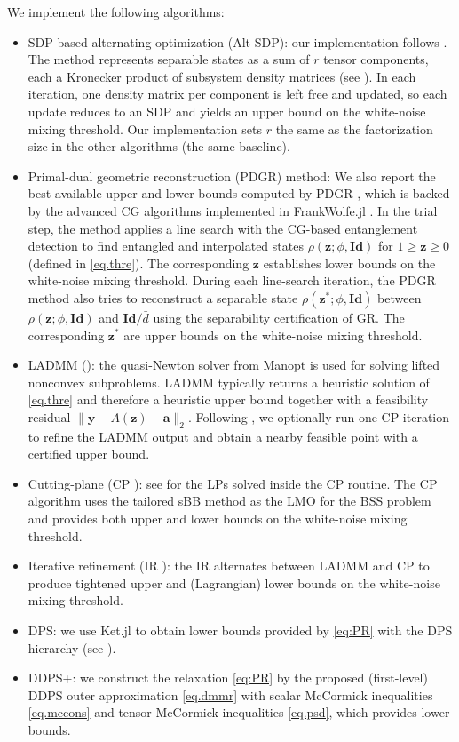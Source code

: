 \documentclass[smallextended]{svjour3}
\newcommand{\1}{\mathbf{1}}
\newcommand{\y}{\mathbf{y}}
\newcommand{\z}{\mathbf{z}}
\newcommand{\Id}{\mathbf{Id}}
\renewcommand{\a}{\mathbf{a}}
\begin{document}
We implement the following algorithms:

\begin{itemize}
    \item SDP-based alternating optimization (Alt-SDP): our implementation follows \cite{Ohst2024certifying}. The method represents separable states as a sum of $r$ tensor components, each a Kronecker product of subsystem density matrices (see ). In each iteration, one density matrix per component is left free and updated, so each update reduces to an SDP and yields an upper bound on the white-noise mixing threshold. Our implementation sets $r$ the same as the factorization size in the other algorithms (the same baseline).
    \item Primal-dual geometric reconstruction (PDGR) method: We also report the best available upper and lower bounds computed by PDGR \cite{liu2025unified}, which is backed by the advanced CG algorithms implemented in FrankWolfe.jl \cite{besanccon2022frankwolfe}. In the trial step, the method applies a line search with the CG-based entanglement detection to find entangled and interpolated states $\rho(\z; \phi,\Id)$ for $ 1 \ge \z \ge 0$ (defined in \eqref{eq.thre}). The corresponding  $\z$ establishes lower bounds on the white-noise mixing threshold. During each line-search iteration, the PDGR method also tries to reconstruct a separable state $\rho(\z^*; \phi,\Id)$ between $\rho(\z; \phi,\Id)$ and $\Id/\bar{d}$ using the separability certification of GR. The corresponding $\z^*$ are upper bounds on the white-noise mixing threshold.


    \item LADMM (): the quasi-Newton solver from Manopt is used for solving lifted nonconvex subproblems. LADMM typically returns a heuristic solution of \eqref{eq.thre} and therefore a heuristic upper bound together with a feasibility residual $\| \y - A(\z) - \a\|_2$. Following , we optionally run one CP iteration to refine the LADMM output and obtain a nearby feasible point with a certified upper bound.
    \item Cutting-plane (CP ): see  for the LPs solved inside the CP routine. The CP algorithm uses the tailored sBB method as the LMO for the BSS problem and provides both upper and lower bounds on the white-noise mixing threshold.
    \item Iterative refinement (IR ): the IR alternates between LADMM and CP to produce tightened upper and (Lagrangian) lower bounds on the white-noise mixing threshold.
    \item DPS: we use  Ket.jl to obtain lower bounds provided by \eqref{eq:PR} with the DPS hierarchy (see ).
    \item DDPS+: we construct the relaxation \eqref{eq:PR} by the proposed (first-level) DDPS outer approximation \eqref{eq.dmmr}  with  scalar  McCormick inequalities  \eqref{eq.mccons} and tensor McCormick inequalities \eqref{eq.psd}, which provides lower bounds.
\end{itemize}
\end{document}
